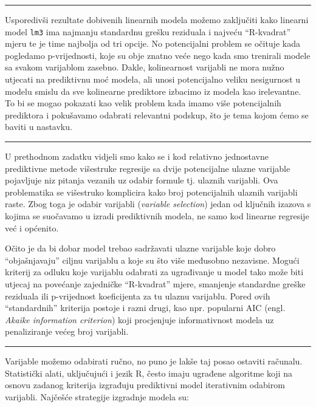 \documentclass[]{book}
\theoremstyle{definition}
\theoremstyle{definition}
\theoremstyle{definition}
\theoremstyle{remark}
\begin{document}
\begin{center}\rule{0.5\linewidth}{\linethickness}\end{center}

Usporedivši rezultate dobivenih linearnih modela možemo zaključiti kako
linearni model \texttt{lm3} ima najmanju standardnu grešku reziduala i
najveću ``R-kvadrat'' mjeru te je time najbolja od tri opcije. No
potencijalni problem se očituje kada pogledamo p-vrijednosti, koje su
obje znatno veće nego kada smo trenirali modele sa svakom varijablom
zasebno. Dakle, kolinearnost varijabli ne mora nužno utjecati na
prediktivnu moć modela, ali unosi potencijalno veliku nesigurnost u
modelu smislu da sve kolinearne prediktore izbacimo iz modela kao
irelevantne. To bi se mogao pokazati kao velik problem kada imamo više
potencijalnih prediktora i pokušavamo odabrati relevantni podskup, što
je tema kojom ćemo se baviti u nastavku.

\begin{center}\rule{0.5\linewidth}{\linethickness}\end{center}

U prethodnom zadatku vidjeli smo kako se i kod relativno jednostavne
prediktivne metode višestruke regresije sa dvije potencijalne ulazne
varijable pojavljuje niz pitanja vezanih uz odabir formule tj. ulaznih
varijabli. Ova problematika se višestruko komplicira kako broj
potencijalnih ulaznih varijabli raste. Zbog toga je odabir varijabli
(\emph{variable selection}) jedan od ključnih izazova s kojima se
suočavamo u izradi prediktivnih modela, ne samo kod linearne regresije
već i općenito.

Očito je da bi dobar model trebao sadržavati ulazne varijable koje dobro
``objašnjavaju'' ciljnu varijablu a koje su što više međusobno
nezavisne. Mogući kriterij za odluku koje varijablu odabrati za
ugrađivanje u model tako može biti utjecaj na povećanje zajedničke
``R-kvadrat'' mjere, smanjenje standardne greške reziduala ili
p-vrijednost koeficijenta za tu ulaznu varijablu. Pored ovih
``standardnih'' kriterija postoje i razni drugi, kao npr. popularni AIC
(engl. \emph{Akaike information criterion}) koji procjenjuje
informativnost modela uz penaliziranje većeg broj varijabli.

\begin{center}\rule{0.5\linewidth}{\linethickness}\end{center}

Varijable možemo odabirati ručno, no puno je lakše taj posao ostaviti
računalu. Statistički alati, uključujući i jezik R, često imaju ugrađene
algoritme koji na osnovu zadanog kriterija izgrađuju prediktivni model
iterativnim odabirom varijabli. Najčešće strategije izgradnje modela su:
\end{document}
